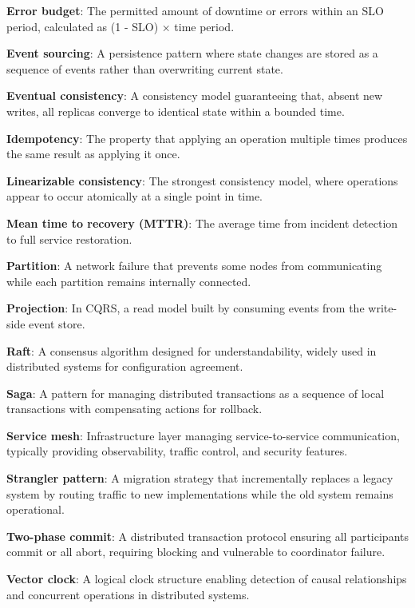 \textbf{Error budget}: The permitted amount of downtime or errors within an SLO period, calculated as (1 - SLO) × time period.

\textbf{Event sourcing}: A persistence pattern where state changes are stored as a sequence of events rather than overwriting current state.

\textbf{Eventual consistency}: A consistency model guaranteeing that, absent new writes, all replicas converge to identical state within a bounded time.

\textbf{Idempotency}: The property that applying an operation multiple times produces the same result as applying it once.

\textbf{Linearizable consistency}: The strongest consistency model, where operations appear to occur atomically at a single point in time.

\textbf{Mean time to recovery (MTTR)}: The average time from incident detection to full service restoration.

\textbf{Partition}: A network failure that prevents some nodes from communicating while each partition remains internally connected.

\textbf{Projection}: In CQRS, a read model built by consuming events from the write-side event store.

\textbf{Raft}: A consensus algorithm designed for understandability, widely used in distributed systems for configuration agreement.

\textbf{Saga}: A pattern for managing distributed transactions as a sequence of local transactions with compensating actions for rollback.

\textbf{Service mesh}: Infrastructure layer managing service-to-service communication, typically providing observability, traffic control, and security features.

\textbf{Strangler pattern}: A migration strategy that incrementally replaces a legacy system by routing traffic to new implementations while the old system remains operational.

\textbf{Two-phase commit}: A distributed transaction protocol ensuring all participants commit or all abort, requiring blocking and vulnerable to coordinator failure.

\textbf{Vector clock}: A logical clock structure enabling detection of causal relationships and concurrent operations in distributed systems.
